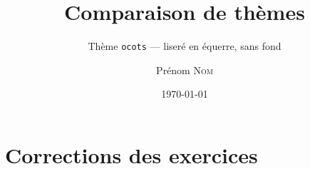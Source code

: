 \documentclass[11pt]{ocots-book}
\title{Comparaison de thèmes}
\subtitle{Thème \texttt{ocots} --- liseré en équerre, sans fond}
\author{Prénom \textsc{Nom}}
\date{\today}
\begin{document}
\maketitle
\ocotscollectsolutions%



\chapter{Corrections des exercices}
\ocotsprintsolutions%


\end{document}
